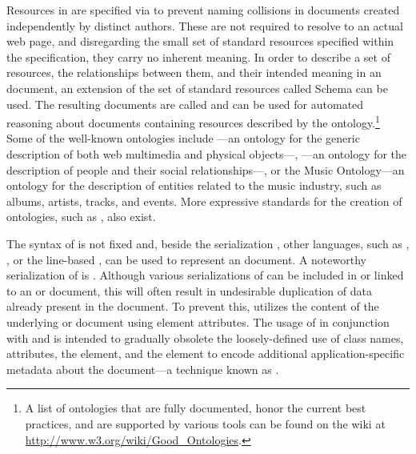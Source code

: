 \documentclass{book}
\begin{document}
Resources in  are specified via  to prevent naming
collisions in  documents created independently by distinct authors.
These  are not required to resolve to an actual web page, and
disregarding the small set of standard resources specified within the
 specification, they carry no inherent meaning. In order to
describe a set of resources, the relationships between them, and their intended
meaning in an  document, an extension of the set of standard
resources called  Schema \cite{brickley04} can be used. The
resulting documents are called 
 and can be used for automated reasoning about
 documents containing resources described by the
ontology.\footnote{
  A list of ontologies that are fully documented, honor the current best
  practices, and are supported by various tools can be found on the
   wiki at \url{http://www.w3.org/wiki/Good_Ontologies}.
} Some of the well-known ontologies include ---an ontology for the
generic description of both web multimedia and physical objects---,
---an ontology for the description of people and their social
relationships---, or the Music Ontology---an ontology for the description of
entities related to the music industry, such as albums, artists, tracks, and
events. More expressive standards for the creation of ontologies, such as
, also exist.

The syntax of  is not fixed and, beside the 
serialization \cite{lassira99}, other languages, such as ,
 \cite{beckett14:turtle}, or the line-based 
\cite{beckett14:nt}, can be used to represent an  document. A
noteworthy serialization of  is .  Although various
serializations of  can be included in or linked to an
 or  document, this will often result in
undesirable duplication of data already present in the document. To prevent
this,  utilizes the content of the underlying  or
 document using element attributes. The usage of 
in conjunction with  and  is intended to gradually
obsolete the loosely-defined use of  class names, attributes, the
 element, and the  element to encode additional
application-specific metadata about the document---a technique known as
.
\end{document}
